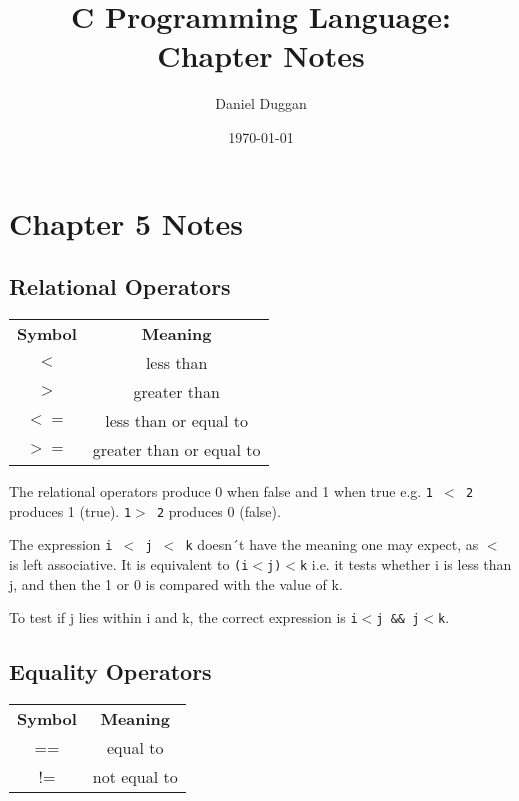 \documentclass{article}
\title{C Programming Language: Chapter Notes}
\author{Daniel Duggan}
\date{\today}
\begin{document}
\maketitle

\section{Chapter 5 Notes}

\subsection{Relational Operators}

\begin{center}
\begin{tabular}{ |c|c| } 
 \hline
 \textbf{Symbol} & \textbf{Meaning}  \\ 
 $<$ & less than  \\ 
 $>$ & greater than  \\
 $<=$ & less than or equal to \\
 $>=$ & greater than or equal to\\ 
 \hline
\end{tabular}
\end{center}

\noindent The relational operators produce 0 when false and 1 when true e.g. \texttt{1 $<$ 2} produces 1 (true). \texttt{1$>$ 2} produces 0 (false).

\noindent The expression \texttt{i $<$ j $<$ k} doesn´t have the meaning one may expect, as $<$ is left associative. It is equivalent to \texttt{(i$<$j)$<$k} i.e. it tests whether i is less than j, and then the 1 or 0 is compared with the value of k.

\noindent To test if j lies within i and k, the correct expression is \texttt{i$<$j \&\& j$<$k}.

\subsection{Equality Operators}

\begin{center}
\begin{tabular}{ |c|c| } 
 \hline
 \textbf{Symbol} & \textbf{Meaning}  \\ 
 == & equal to  \\ 
 != & not equal to  \\ 
 \hline
\end{tabular}
\end{center}
\end{document}
